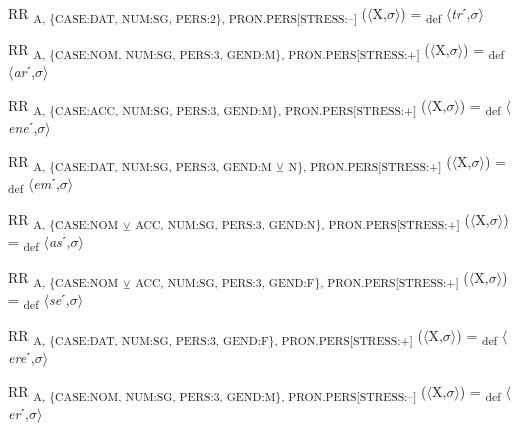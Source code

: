 {\begin{exe}
 RR \textsubscript{A, \{CASE:DAT, NUM:SG, PERS:2\}, PRON.PERS[STRESS:–]} ($\langle$X,$\sigma $$\rangle$) = \textsubscript{def} $\langle$\textit{tr}ˊ,$\sigma $$\rangle$
\end{exe}

\begin{exe}
 RR \textsubscript{A, \{CASE:NOM, NUM:SG, PERS:3, GEND:M\}, PRON.PERS[STRESS:+]} ($\langle$X,$\sigma $$\rangle$) = \textsubscript{def} $\langle$\textit{ar}ˊ,$\sigma $$\rangle$
\end{exe}

\begin{exe}
 RR \textsubscript{A, \{CASE:ACC, NUM:SG, PERS:3, GEND:M\}, PRON.PERS[STRESS:+]} ($\langle$X,$\sigma $$\rangle$) = \textsubscript{def} $\langle$\textit{ene}ˊ,$\sigma $$\rangle$
\end{exe}

\begin{exe}
 RR \textsubscript{A, \{CASE:DAT, NUM:SG, PERS:3, GEND:M} \textsubscript{${\veebar}$}\textsubscript{ N\}, PRON.PERS[STRESS:+]} ($\langle$X,$\sigma $$\rangle$) = \textsubscript{def} $\langle$\textit{em}ˊ,$\sigma $$\rangle$
\end{exe}

\begin{exe}
 RR \textsubscript{A, \{CASE:NOM} \textsubscript{${\veebar}$}\textsubscript{ ACC, NUM:SG, PERS:3, GEND:N\}, PRON.PERS[STRESS:+]} ($\langle$X,$\sigma $$\rangle$) = \textsubscript{def} $\langle$\textit{as}ˊ,$\sigma $$\rangle$
\end{exe}

\begin{exe}
 RR \textsubscript{A, \{CASE:NOM} \textsubscript{${\veebar}$}\textsubscript{ ACC, NUM:SG, PERS:3, GEND:F\}, PRON.PERS[STRESS:+]} ($\langle$X,$\sigma $$\rangle$) = \textsubscript{def} $\langle$\textit{se}ˊ,$\sigma $$\rangle$
\end{exe}

\begin{exe}
 RR \textsubscript{A, \{CASE:DAT, NUM:SG, PERS:3, GEND:F\}, PRON.PERS[STRESS:+]} ($\langle$X,$\sigma $$\rangle$) = \textsubscript{def} $\langle$\textit{ere}ˊ,$\sigma $$\rangle$
\end{exe}

\begin{exe}
 RR \textsubscript{A, \{CASE:NOM, NUM:SG, PERS:3, GEND:M\}, PRON.PERS[STRESS:–]} ($\langle$X,$\sigma $$\rangle$) = \textsubscript{def} $\langle$\textit{er}ˊ,$\sigma $$\rangle$
\end{exe}

}
